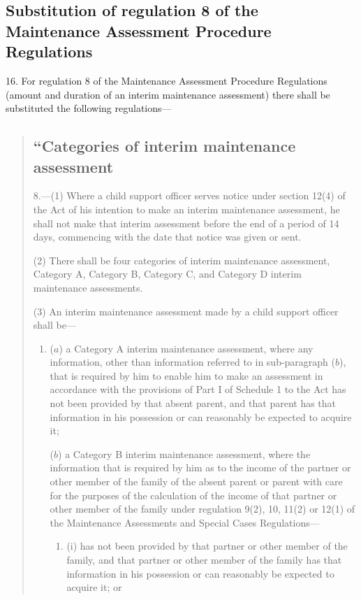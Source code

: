 \documentclass[a4paper]{article}
\begin{document}
\subsection[16. Substitution of regulation 8 of the Maintenance Assessment Procedure Regulations]{\sloppy Substitution of regulation 8 of the Maintenance Assessment Procedure Regulations}

16.  For regulation 8 of the Maintenance Assessment Procedure Regulations (amount and duration of an interim maintenance assessment) there shall be substituted the following regulations—
\begin{quotation}
\subsection*{“Categories of interim maintenance assessment}

8.—(1) Where a child support officer serves notice under section 12(4) of the Act of his intention to make an interim maintenance assessment, he shall not make that interim assessment before the end of a period of 14 days, commencing with the date that notice was given or sent.

(2) There shall be four categories of interim maintenance assessment, Category A, Category B, Category C, and Category D interim maintenance assessments.

(3) An interim maintenance assessment made by a child support officer shall be—
\begin{enumerate}\item[]
($a$) a Category A interim maintenance assessment, where any information, other than information referred to in sub-paragraph ($b$), that is required by him to enable him to make an assessment in accordance with the provisions of Part I of Schedule 1 to the Act has not been provided by that absent parent, and that parent has that information in his possession or can reasonably be expected to acquire it;

($b$) a Category B interim maintenance assessment, where the information that is required by him as to the income of the partner or other member of the family of the absent parent or parent with care for the purposes of the calculation of the income of that partner or other member of the family under regulation 9(2), 10, 11(2) or 12(1) of the Maintenance Assessments and Special Cases Regulations—
\begin{enumerate}\item[]
(i) has not been provided by that partner or other member of the family, and that partner or other member of the family has that information in his possession or can reasonably be expected to acquire it; or


\end{enumerate}
\end{enumerate}
\end{quotation}
\end{document}
